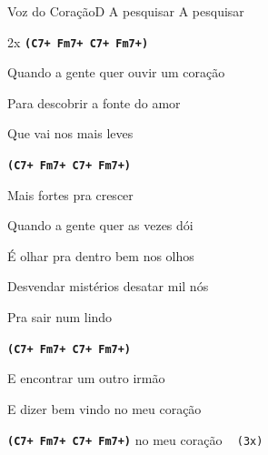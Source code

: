 \documentclass[a4,12pt,oneside]{book}
\newcommand{\RevDate}{\today}
\newcommand{\NotCCLIed}{\relax}
\begin{document}
\begin{song}{Voz do Coração}{D}
  {A pesquisar}
  {A pesquisar}
  {}
  {\NotCCLIed}
  
	\renewcommand{\RevDate}{20 de agosto de 2015}
 
	
	\ifChordBk	
		\vspace{-2em}\flushright{\Csaumchord \quad \Fmsaumchord \quad \Fchord \quad \Gschord}
		\vspace{-1ex}
	\fi
	
		\begin{SBBracket}{2x}
			\ifChordBk	
			{\normalsize \texttt{\textbf{(C7+ Fm7+ C7+ Fm7+)}}}
			\fi
			

			Quando a gente quer ouvir um coração

			Para descobrir a fonte do amor
			
			Que vai nos  mais leves
			
			\ifChordBk	
			{\normalsize \texttt{\textbf{(C7+ Fm7+ C7+ Fm7+)}}}
			\fi
			
			Mais fortes pra crescer
			
			Quando a gente quer as vezes dói
			
			É olhar pra dentro bem nos olhos
			
			Desvendar mistérios desatar mil nós
			
			Pra sair num  lindo
			
			\ifChordBk	
			{\normalsize \texttt{\textbf{(C7+ Fm7+ C7+ Fm7+)}}}
			\fi

			E encontrar um outro irmão
			
			E dizer bem vindo no meu coração
		\end{SBBracket}

		\begin{SBVerse*}
			\ifChordBk	
			{\normalsize \texttt{\textbf{(C7+ Fm7+ C7+ Fm7+)}}}
			\fi
			\quad no meu coração ~ \texttt{(3x)}
		\end{SBVerse*}	
	
\end{song}
\end{document}
